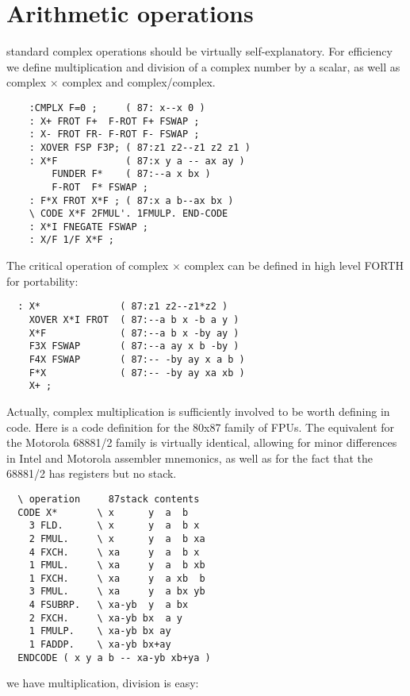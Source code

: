 \section{Arithmetic operations}
 standard complex operations should be virtually self-explanatory. For efficiency we define multiplication and division of a complex number by a scalar, as well as complex $\times$ complex and complex/complex.

\begin{lstlisting}
    :CMPLX F=0 ;     ( 87: x--x 0 )
    : X+ FROT F+  F-ROT F+ FSWAP ;
    : X- FROT FR- F-ROT F- FSWAP ;
    : XOVER FSP F3P; ( 87:z1 z2--z1 z2 z1 )
    : X*F            ( 87:x y a -- ax ay )
        FUNDER F*    ( 87:--a x bx )
        F-ROT  F* FSWAP ;
    : F*X FROT X*F ; ( 87:x a b--ax bx )
    \ CODE X*F 2FMUL'. 1FMULP. END-CODE
    : X*I FNEGATE FSWAP ;
    : X/F 1/F X*F ;
\end{lstlisting}

The critical operation of complex $\times$ complex can be defined in high level FORTH for portability:

\begin{lstlisting}
  : X*              ( 87:z1 z2--z1*z2 )
    XOVER X*I FROT  ( 87:--a b x -b a y )
    X*F             ( 87:--a b x -by ay )
    F3X FSWAP       ( 87:--a ay x b -by )
    F4X FSWAP       ( 87:-- -by ay x a b )
    F*X             ( 87:-- -by ay xa xb )
    X+ ;
\end{lstlisting}

Actually, complex multiplication is sufficiently involved to be worth defining in code. Here is a code definition for the 80x87 family of FPUs. The equivalent for the Motorola 68881/2 family is virtually identical, allowing for minor differences in Intel and Motorola assembler mnemonics, as well as for the fact that the 68881/2 has registers but no stack.

\begin{lstlisting}
  \ operation     87stack contents
  CODE X*       \ x      y  a  b
    3 FLD.      \ x      y  a  b x
    2 FMUL.     \ x      y  a  b xa
    4 FXCH.     \ xa     y  a  b x
    1 FMUL.     \ xa     y  a  b xb
    1 FXCH.     \ xa     y  a xb  b
    3 FMUL.     \ xa     y  a bx yb
    4 FSUBRP.   \ xa-yb  y  a bx
    2 FXCH.     \ xa-yb bx  a y
    1 FMULP.    \ xa-yb bx ay
    1 FADDP.    \ xa-yb bx+ay
  ENDCODE ( x y a b -- xa-yb xb+ya )
\end{lstlisting}

 we have multiplication, division is easy:

